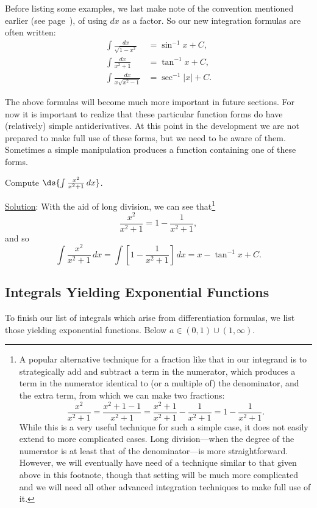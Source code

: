 Before listing some examples, we last make note of the convention
mentioned earlier (see page~\pageref{UsingdxAsAFactor}), of
using $dx$ as a factor.  So our new integration formulas
are often written:
\begin{align*}
\int\frac{dx}{\sqrt{1-x^2}}&=\sin^{-1}x+C,\\
\int\frac{dx}{x^2+1}&=\tan^{-1}x+C,\\
\int\frac{dx}{x\sqrt{x^2-1}}&=\sec^{-1}|x|+C.
\end{align*}

The above formulas will become much more important in future sections.
For now it is important to realize that these particular function forms 
do have (relatively) simple antiderivatives.  At this point in the 
development we are not prepared to make full use of these forms, 
but we need to be aware of them.  Sometimes a simple manipulation
produces a function containing one of these forms.

\bex Compute $\ds{\int\frac{x^2}{x^2+1}\,dx}$.

\underline{Solution}: With the aid of long division, we can see that\footnote{%
A popular alternative 
technique for a fraction like that in our integrand is to 
strategically add and subtract a term in the numerator, which
produces a term in the numerator identical to (or a multiple of)
the denominator,
and the extra term, from which we can make two fractions:
$$\frac{x^2}{x^2+1}=\frac{x^2+1-1}{x^2+1}
      =\frac{x^2+1}{x^2+1}-\frac1{x^2+1}
      =1-\frac1{x^2+1}.$$
While this is a very useful technique for such a simple case, 
it does not easily extend to more complicated cases.  Long division---when
the degree of the numerator is at least that of the denominator---is more
straightforward.  However, we will eventually have need of a technique
similar to that given above in this footnote, though that setting will be 
much more complicated and we will need all other advanced integration
techniques to make full use of it.
}
$$\frac{x^2}{x^2+1}=1-\frac1{x^2+1},$$
and so
$$\int\frac{x^2}{x^2+1}\,dx
=\int\left[1-\frac1{x^2+1}\right]\,dx
=x-\tan^{-1}x+C.$$

\eex

\subsection{Integrals Yielding Exponential Functions}

To finish our list of integrals which arise from differentiation
formulas, we list those yielding exponential functions.  Below
$a\in(0,1)\cup(1,\infty)$.

